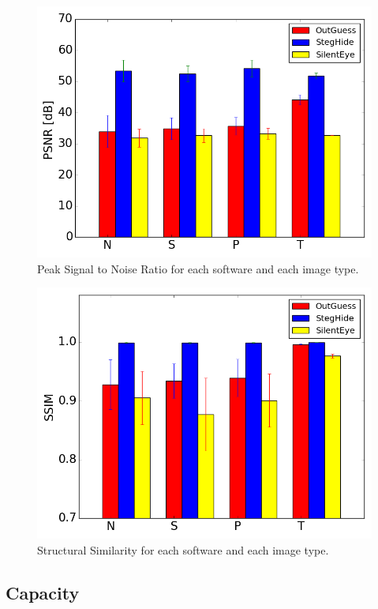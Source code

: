 \documentclass[11pt]{article}
\begin{document}
\begin{figure}[h!]
\centering
\includegraphics[scale=0.4]{PSNR.png}
\caption{Peak Signal to Noise Ratio for each software and each image type.}
\label{Fig:PSNR}
\end{figure}

\begin{figure}[h!]
\centering
\includegraphics[scale=0.4]{SSIM.png}
\caption{Structural Similarity for each software and each image type.}
\label{Fig:SSIM}
\end{figure}

\subsection{Capacity}
\end{document}

